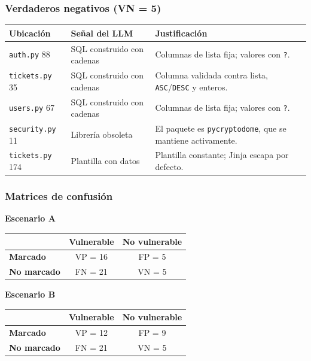\documentclass[11pt,letterpaper]{article}
\newcommand{\f}[1]{\texttt{#1}}
\newcommand{\enc}[1]{\textbf{#1}}
\begin{document}
\subsubsection{Verdaderos negativos (VN = 5)}
\begin{center}
\begin{tabular}{p{2.8cm}p{4.2cm}p{6.6cm}}
\toprule
\enc{Ubicación} & \enc{Señal del LLM} & \enc{Justificación} \\
\midrule
\f{auth.py} 88 & SQL construido con cadenas & Columnas de lista fija; valores con \f{?}. \\
\f{tickets.py} 35 & SQL construido con cadenas & Columna validada contra lista, \f{ASC}/\f{DESC} y enteros. \\
\f{users.py} 67 & SQL construido con cadenas & Columnas de lista fija; valores con \f{?}. \\
\f{security.py} 11 & Librería obsoleta & El paquete es \f{pycryptodome}, que se mantiene activamente. \\
\f{tickets.py} 174 & Plantilla con datos & Plantilla constante; Jinja escapa por defecto. \\
\bottomrule
\end{tabular}
\end{center}

\subsubsection{Matrices de confusión}
\begin{center}
\begin{minipage}{0.46\textwidth}
\centering
\textbf{Escenario A}\par\vspace{4pt}
\begin{tabular}{lcc}
\toprule
 & \enc{Vulnerable} & \enc{No vulnerable} \\
\midrule
\enc{Marcado} & VP = 16 & FP = 5 \\
\enc{No marcado} & FN = 21 & VN = 5 \\
\bottomrule
\end{tabular}
\end{minipage}\hfill
\begin{minipage}{0.46\textwidth}
\centering
\textbf{Escenario B}\par\vspace{4pt}
\begin{tabular}{lcc}
\toprule
 & \enc{Vulnerable} & \enc{No vulnerable} \\
\midrule
\enc{Marcado} & VP = 12 & FP = 9 \\
\enc{No marcado} & FN = 21 & VN = 5 \\
\bottomrule
\end{tabular}
\end{minipage}
\end{center}
\end{document}
